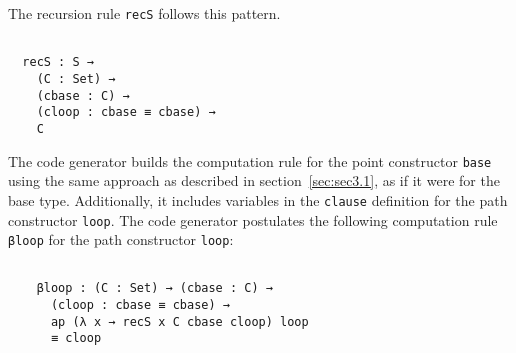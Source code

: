 \documentclass[runningheads]{llncs}
\begin{document}

The recursion rule {\tt recS} follows this pattern.

\begin{center}
\fontsize{7.9pt}{2pt}\selectfont
\begin{BVerbatim}

  recS : S → 
    (C : Set) →
    (cbase : C) →
    (cloop : cbase ≡ cbase) →
    C

\end{BVerbatim}
\end{center}
\normalsize

The code generator builds the computation rule for the point constructor {\tt base} using the same approach as described in section~\ref{sec:sec3.1}, as if it were for the base type.
Additionally, it includes variables in the {\tt clause} definition for the path constructor {\tt loop}.
The code generator postulates the following computation rule {\tt βloop} for the path constructor {\tt loop}:

\begin{center}
\fontsize{7.9pt}{2pt}\selectfont
\begin{BVerbatim}

    βloop : (C : Set) → (cbase : C) → 
      (cloop : cbase ≡ cbase) → 
      ap (λ x → recS x C cbase cloop) loop 
      ≡ cloop

\end{BVerbatim}
\end{center}
\normalsize
\end{document}
